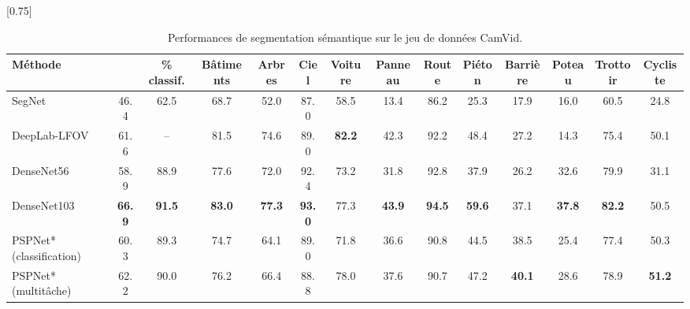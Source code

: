 \begin{table}[!t]
  \caption{Performances de segmentation sémantique sur le jeu de données CamVid.}
  \label{tab:camvid_results}
\setlength{\tabcolsep}{1pt}
\scalebox{0.75}[0.75]{
\begin{tabularx}{1.35\textwidth}{Y c c c c c c c c c c c c c}
\toprule
Méthode &  & \% classif. & Bâtiments & Arbres & Ciel & Voiture & Panneau & Route & Piéton & Barrière & Poteau & Trottoir & Cycliste\\
\midrule
SegNet~\cite{badrinarayanan_segnet_2017} & \num{46.4} & \num{62.5} & \num{68.7} & \num{52.0} & \num{87.0} & \num{58.5} & \num{13.4} & \num{86.2} & \num{25.3} & \num{17.9} & \num{16.0} & \num{60.5} & \num{24.8}\\
DeepLab-LFOV~\cite{chen_deeplab_2018} & \num{61.6} & -- & \num{81.5} & \num{74.6} & \num{89.0} & \textbf{\num{82.2}} & \num{42.3} & \num{92.2} & \num{48.4} & \num{27.2} & \num{14.3} & \num{75.4} & \num{50.1}\\
DenseNet56~\cite{jegou_one_2017} & \num{58.9} & \num{88.9} & \num{77.6} & \num{72.0} & \num{92.4} & \num{73.2} & \num{31.8} & \num{92.8} & \num{37.9} & \num{26.2} & \num{32.6} & \num{79.9} & \num{31.1}\\
DenseNet103~\cite{jegou_one_2017} & \textbf{\num{66.9}} & \textbf{\num{91.5}} & \textbf{\num{83.0}} & \textbf{\num{77.3}} & \textbf{\num{93.0}} & \num{77.3} & \textbf{\num{43.9}} & \textbf{\num{94.5}} & \textbf{\num{59.6}} & \num{37.1} & \textbf{\num{37.8}} & \textbf{\num{82.2}} & \num{50.5}\\
\midrule
PSPNet* (classification) & \num{60.3} & \num{89.3} & \num{74.7} & \num{64.1} & \num{89.0} & \num{71.8} & \num{36.6} & \num{90.8} & \num{44.5} & \num{38.5} & \num{25.4} & \num{77.4} & \num{50.3}\\
PSPNet* (multitâche) & \num{62.2} & \num{90.0} & \num{76.2} & \num{66.4} &  \num{88.8} & \num{78.0} & \num{37.6} & \num{90.7} & \num{47.2} & \textbf{\num{40.1}} & \num{28.6} & \num{78.9} & \textbf{\num{51.2}}\\
\bottomrule
\end{tabularx}}
\end{table}

